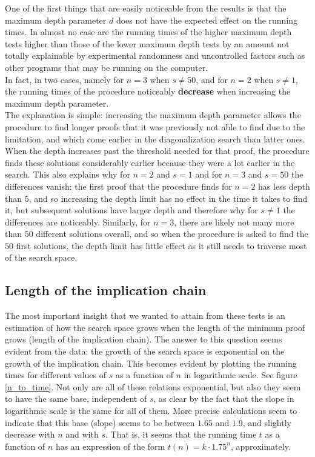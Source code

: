 \documentclass[12pt,a4paper]{article}
\begin{document}
One of the first things that are easily noticeable from the results is that the maximum depth parameter $d$ does not have the expected effect on the running times. In almost no case are the running times of the higher maximum depth tests higher than those of the lower maximum depth tests by an amount not totally explainable by experimental randomness and uncontrolled factors such as other programs that may be running on the computer.\\

In fact, in two cases, namely for $n = 3$ when $s \neq 50$, and for $n = 2$ when $s \neq 1$, the running times of the procedure noticeably {\bf{decrease}} when increasing the maximum depth parameter.\\

The explanation is simple: increasing the maximum depth parameter allows the procedure to find longer proofs that it was previously not able to find due to the limitation, and which come earlier in the diagonalization search than latter ones. When the depth increases past the threshold needed for that proof, the procedure finds these solutions considerably earlier because they were a lot earlier in the search. This also explains why for $n = 2$ and $s = 1$ and for $n = 3$ and $s = 50$ the differences vanish: the first proof that the procedure finds for $n = 2$ has less depth than $5$, and so increasing the depth limit has no effect in the time it takes to find it, but subsequent solutions have larger depth and therefore why for $s \neq 1$ the differences are noticeably. Similarly, for $n = 3$, there are likely not many more than $50$ different solutions overall, and so when the procedure is asked to find the $50$ first solutions, the depth limit has little effect as it still needs to traverse most of the search space.\\

\subsection{Length of the implication chain}

The most important insight that we wanted to attain from these tests is an estimation of how the search space grows when the length of the minimum proof grows (length of the implication chain). The answer to this question seems evident from the data: the growth of the search space is exponential on the growth of the implication chain. This becomes evident by plotting the running times for different values of $s$ as a function of $n$ in logarithmic scale. See figure \ref{n_to_time}. Not only are all of these relations exponential, but also they seem to have the same base, independent of $s$, as clear by the fact that the slope in logarithmic scale is the same for all of them. More precise calculations seem to indicate that this base (slope) seems to be between $1.65$ and $1.9$, and slightly decrease with $n$ and with $s$. That is, it seems that the running time $t$ as a function of $n$ has an expression of the form $t(n) = k \cdot 1.75^{n}$, approximately.
\end{document}
